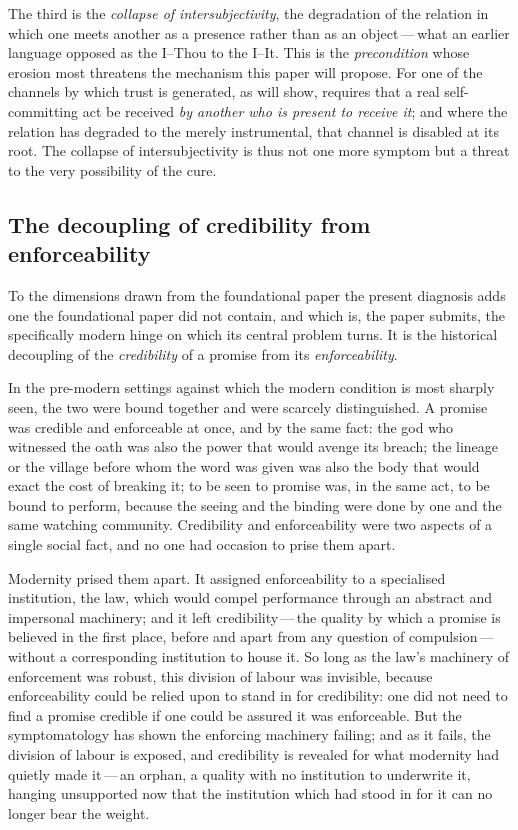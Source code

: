 The third is the \emph{collapse of intersubjectivity}, the degradation of the relation in which one meets another as a presence rather than as an object\,---\,what an earlier language opposed as the I--Thou to the I--It. This is the \emph{precondition} whose erosion most threatens the mechanism this paper will propose. For one of the channels by which trust is generated, as  will show, requires that a real self-committing act be received \emph{by another who is present to receive it}; and where the relation has degraded to the merely instrumental, that channel is disabled at its root. The collapse of intersubjectivity is thus not one more symptom but a threat to the very possibility of the cure.

\subsection{The decoupling of credibility from enforceability}
\label{p13:sub:diag-decoupling}

To the dimensions drawn from the foundational paper the present diagnosis adds one the foundational paper did not contain, and which is, the paper submits, the specifically modern hinge on which its central problem turns. It is the historical decoupling of the \emph{credibility} of a promise from its \emph{enforceability}.

In the pre-modern settings against which the modern condition is most sharply seen, the two were bound together and were scarcely distinguished. A promise was credible and enforceable at once, and by the same fact: the god who witnessed the oath was also the power that would avenge its breach; the lineage or the village before whom the word was given was also the body that would exact the cost of breaking it; to be seen to promise was, in the same act, to be bound to perform, because the seeing and the binding were done by one and the same watching community. Credibility and enforceability were two aspects of a single social fact, and no one had occasion to prise them apart.

Modernity prised them apart. It assigned enforceability to a specialised institution, the law, which would compel performance through an abstract and impersonal machinery; and it left credibility\,---\,the quality by which a promise is believed in the first place, before and apart from any question of compulsion\,---\,without a corresponding institution to house it. So long as the law's machinery of enforcement was robust, this division of labour was invisible, because enforceability could be relied upon to stand in for credibility: one did not need to find a promise credible if one could be assured it was enforceable. But the symptomatology has shown the enforcing machinery failing; and as it fails, the division of labour is exposed, and credibility is revealed for what modernity had quietly made it\,---\,an orphan, a quality with no institution to underwrite it, hanging unsupported now that the institution which had stood in for it can no longer bear the weight.

